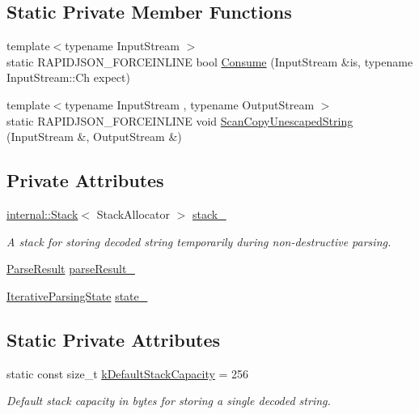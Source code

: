 \subsection*{Static Private Member Functions}
\begin{DoxyCompactItemize}
\item 
{\footnotesize template$<$typename Input\+Stream $>$ }\\static R\+A\+P\+I\+D\+J\+S\+O\+N\+\_\+\+F\+O\+R\+C\+E\+I\+N\+L\+I\+NE bool \mbox{\hyperlink{classrapidjson_1_1_generic_reader_a3bea16d04ccd999df140f5f7cdde1efd}{Consume}} (Input\+Stream \&is, typename Input\+Stream\+::\+Ch expect)
\item 
{\footnotesize template$<$typename Input\+Stream , typename Output\+Stream $>$ }\\static R\+A\+P\+I\+D\+J\+S\+O\+N\+\_\+\+F\+O\+R\+C\+E\+I\+N\+L\+I\+NE void \mbox{\hyperlink{classrapidjson_1_1_generic_reader_afb92d99e5f522570fa72e2cd92fd8a9b}{Scan\+Copy\+Unescaped\+String}} (Input\+Stream \&, Output\+Stream \&)
\end{DoxyCompactItemize}
\subsection*{Private Attributes}
\begin{DoxyCompactItemize}
\item 
\mbox{\hyperlink{classrapidjson_1_1internal_1_1_stack}{internal\+::\+Stack}}$<$ Stack\+Allocator $>$ \mbox{\hyperlink{classrapidjson_1_1_generic_reader_a0d65c1197dc873768616af8fab890e1a}{stack\+\_\+}}
\begin{DoxyCompactList}\small\item\em A stack for storing decoded string temporarily during non-\/destructive parsing. \end{DoxyCompactList}\item 
\mbox{\hyperlink{structrapidjson_1_1_parse_result}{Parse\+Result}} \mbox{\hyperlink{classrapidjson_1_1_generic_reader_ab82d12474045f057c958ea88e2a8c365}{parse\+Result\+\_\+}}
\item 
\mbox{\hyperlink{classrapidjson_1_1_generic_reader_a1fd8fb2f2f017d42c89a5e11cd074e1e}{Iterative\+Parsing\+State}} \mbox{\hyperlink{classrapidjson_1_1_generic_reader_a2c575bbd7365a8fc34bb20978aa4e361}{state\+\_\+}}
\end{DoxyCompactItemize}
\subsection*{Static Private Attributes}
\begin{DoxyCompactItemize}
\item 
static const size\+\_\+t \mbox{\hyperlink{classrapidjson_1_1_generic_reader_a963c65fe821dac21448caa3930788161}{k\+Default\+Stack\+Capacity}} = 256
\begin{DoxyCompactList}\small\item\em Default stack capacity in bytes for storing a single decoded string. \end{DoxyCompactList}\end{DoxyCompactItemize}


